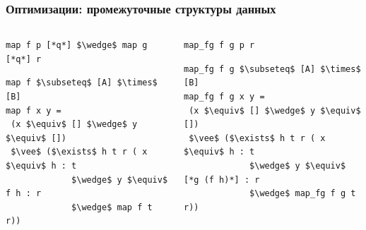 \documentclass{beamer}
\begin{document}
\begin{frame}[fragile]
  \transwipe[direction=90]
  \frametitle{Оптимизации: промежуточные структуры данных}

\begin{columns}
  \begin{column}{5.5cm}
\begin{badcode}
\begin{lstlisting}[frame=single]      
map f p [*q*] $\wedge$ map g [*q*] r
\end{lstlisting}

\begin{lstlisting}[frame=single]  
map f $\subseteq$ [A] $\times$ [B]
map f x y = 
 (x $\equiv$ [] $\wedge$ y $\equiv$ [])
 $\vee$ ($\exists$ h t r ( x $\equiv$ h : t 
             $\wedge$ y $\equiv$ f h : r
             $\wedge$ map f t r))
\end{lstlisting}
\end{badcode}
\end{column}

\pause

\begin{column}{6.3cm}
\begin{goodcode}
\begin{lstlisting}[frame=single]      
map_fg f g p r
\end{lstlisting}

\begin{lstlisting}[frame=single]  
map_fg f g $\subseteq$ [A] $\times$ [B]
map_fg f g x y = 
 (x $\equiv$ [] $\wedge$ y $\equiv$ [])
 $\vee$ ($\exists$ h t r ( x $\equiv$ h : t 
             $\wedge$ y $\equiv$ [*g (f h)*] : r
             $\wedge$ map_fg f g t r))
\end{lstlisting}
\end{goodcode}
\end{column}
\end{columns}
\end{frame}
\end{document}
